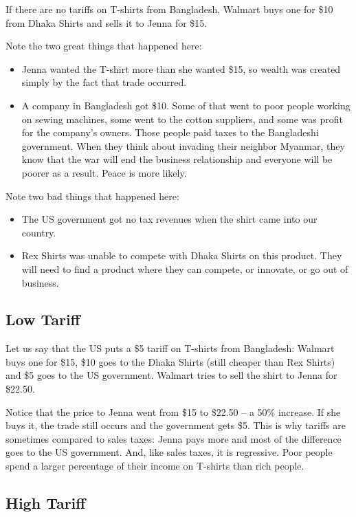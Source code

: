 If there are no tariffs on T-shirts from Bangladesh, Walmart buys one for \$10 from Dhaka Shirts and sells it to Jenna for \$15.

Note the two great things that happened here:
\begin{itemize}
\item Jenna wanted the T-shirt more than she wanted \$15, so wealth was created simply by the fact that trade occurred.
\item A company in Bangladesh got \$10. Some of that went to poor people working on sewing machines, some went to the cotton suppliers, and some was profit for the company's owners. Those people paid taxes to the Bangladeshi government. When they think about invading their neighbor Myanmar, they know that the war will end the business relationship and everyone will be poorer as a result. Peace is more likely.
\end{itemize}

Note two bad things that happened here:
\begin{itemize}
\item The US government got no tax revenues when the shirt came into our country.
\item Rex Shirts was unable to compete with Dhaka Shirts on this product. They will need to find a product where they can compete, or innovate, or go out of business.
\end{itemize}

\subsection{Low Tariff}

Let us say that the US puts a \$5 tariff on T-shirts from Bangladesh: Walmart buys one for \$15, \$10 goes to the Dhaka Shirts (still cheaper than Rex Shirts) and \$5 goes to the US government. Walmart tries to sell the shirt to Jenna for \$22.50.

Notice that the price to Jenna went from \$15 to \$22.50 -- a 50\% increase.  If she buys it, the trade still occurs and the government gets \$5.  This is why tariffs are sometimes compared to sales taxes: Jenna pays more and most of the difference goes to the US government.  And, like sales taxes, it is regressive. Poor people spend a larger percentage of their income on T-shirts than rich people.

\subsection{High Tariff}

